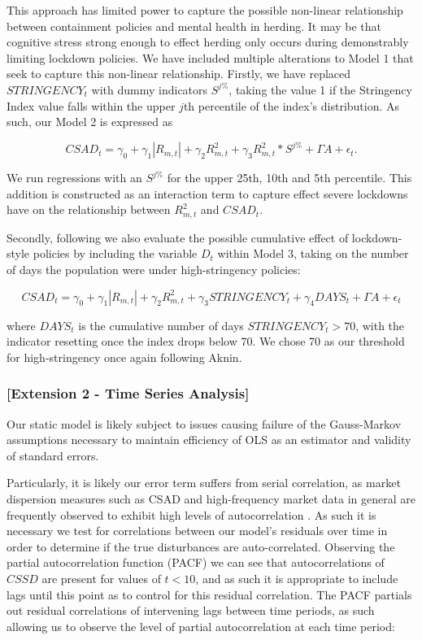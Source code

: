 \documentclass[12pt]{article}
\numberwithin{table}{section}   %
\begin{document}
This approach has limited power to capture the possible non-linear relationship between containment policies and mental health in herding. It may be that cognitive stress strong enough to effect herding only occurs during demonstrably limiting lockdown policies. We have included multiple alterations to Model 1 that seek to capture this non-linear relationship. Firstly, we have replaced $STRINGENCY_t$ with dummy indicators $S^{j\%}$, taking the value 1 if the Stringency Index value falls within the upper $j$th percentile of the index’s distribution. As such, our Model 2 is expressed as

\begin{equation}\label{model-2}
CSAD_t=\gamma_0+\gamma_1 |R_{m,t}|+\gamma_2 R_{m,t}^2+\gamma_3R_{m,t}^2*S^{j\%}+\Gamma{A}+\epsilon_t.
\end{equation}

We run regressions with an $S^{j\%}$ for the upper 25th, 10th and 5th percentile. This addition is constructed as an interaction term to capture effect severe lockdowns have on the relationship between $R^2_{m,t}$ and $CSAD_t$.

Secondly, following \citet{aknin} we also evaluate the possible cumulative effect of lockdown-style policies by including the variable $D_t$ within Model 3, taking on the number of days the population were under high-stringency policies:

\begin{equation}\label{model-3}
CSAD_t=\gamma_0+\gamma_1 |R_{m,t}|+\gamma_2 R_{m,t}^2+\gamma_3STRINGENCY_t+\gamma_4DAYS_t+\Gamma{A}+\epsilon_t
\end{equation}

where $DAYS_t$ is the cumulative number of days $STRINGENCY_t>70$, with the indicator resetting once the index drops below 70. We chose 70 as our threshold for high-stringency once again following Aknin.

\subsubsection*{[Extension 2 - Time Series Analysis]}

Our static model is likely subject to issues causing failure of the Gauss-Markov assumptions necessary to maintain efficiency of OLS as an estimator and validity of standard errors. 

Particularly, it is likely our error term suffers from serial correlation, as market dispersion measures such as CSAD and high-frequency market data in general are frequently observed to exhibit high levels of autocorrelation \citep{cck}. As such it is necessary we test for correlations between our model’s residuals over time in order to determine if the true disturbances are auto-correlated. Observing the partial autocorrelation function (PACF) we can see that autocorrelations of $CSSD$ are present for values of $t<10$, and as such it is appropriate to include lags until this point as to control for this residual correlation. The PACF partials out residual correlations of intervening lags between time periods, as such allowing us to observe the level of partial autocorrelation at each time period:
\end{document}
